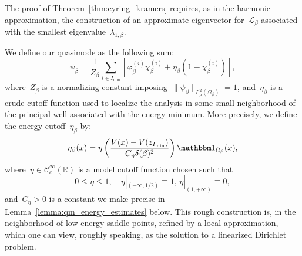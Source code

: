 \documentclass[10pt]{article}
\newcommand{\cL}{\mathcal{L}}
\newcommand{\R}{\mathbb{R}}
\newcommand{\1}{\mathbbm 1}
\newcommand{\largeRadius}{\delta}
\newcommand{\localCutoff}[1]{\chi_\beta^{(#1)}} %
\newcommand{\energyCutoffConst}{C_\eta}
\begin{document}
            The proof of Theorem~\ref{thm:eyring_kramers} requires, as in the harmonic approximation, the construction of an approximate eigenvector for~$\cL_\beta$ associated with the smallest eigenvalue~$\lambda_{1,\beta}$.
            
            We define our quasimode as the following sum:
            \begin{equation}
                \label{eq:global_quasimode}
                \psi_\beta = \frac1{Z_\beta}\sum_{i\in I_{\min}}\left[\varphi_\beta^{(i)}\localCutoff{i} + \eta_\beta(1-\localCutoff{i})\right],
            \end{equation}
            where~$Z_\beta$ is a normalizing constant imposing~$\|\psi_\beta\|_{L_\mu^2(\Omega_\beta)}=1$, and~$\eta_\beta$ is a crude cutoff function used to localize the analysis in some small neighborhood of the principal well associated with the energy minimum.
            More precisely, we define the energy cutoff~$\eta_\beta$ by:
            \begin{equation}
                \label{eq:energy_cutoff}
                \eta_\beta(x) = \eta\left(\frac{V(x)-V(z_{I_{\min}})}{\energyCutoffConst \largeRadius(\beta)^2}\right)\1_{\Omega_\beta}(x),
            \end{equation}
            where~$\eta\in\mathcal C_c^\infty(\R)$ is a model cutoff function chosen such that
            \[0\leq \eta\leq 1,\quad \eta|_{(-\infty,1/2)}\equiv 1,\,\eta|_{(1,+\infty)}\equiv 0,\]
            and~$\energyCutoffConst>0$ is a constant we make precise in Lemma~\eqref{lemma:qm_energy_estimates} below.
            This rough construction is, in the neighborhood of low-energy saddle points, refined by a local approximation, which one can view, roughly speaking, as the solution to a linearized Dirichlet problem.
\end{document}
